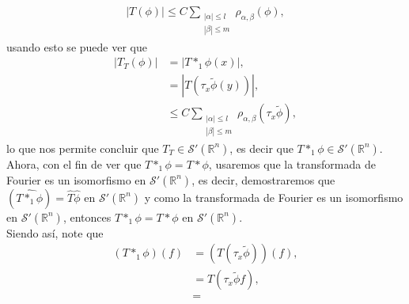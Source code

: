 \begin{homeworkProblem}
\begin{solution}
      \begin{align*}
        |T(\phi)|\leq C\sum_{\substack{|\alpha|\leq l\\ |\beta|\leq m}}\rho_{\alpha,\beta}(\phi),
      \end{align*}
      usando esto se puede ver que
      \begin{align*}
        |T_{T}(\phi)|&=\left| T*_{1}\phi(x) \right|,\\
        &=\left| T\left( \tau_{x}\tilde{\phi}(y) \right) \right|,\\
        &\leq C\sum_{\substack{|\alpha|\leq l\\|\beta|\leq m}}\rho_{\alpha,\beta}(\tau_{x}\tilde{\phi}),
      \end{align*}
      lo que nos permite concluir que $T_{T}\in\mathcal{S}'(\mathbb{R}^{n})$, es decir que $T*_{1}\phi\in\mathcal{S}'(\mathbb{R}^{n})$.\\
      Ahora, con el fin de ver que $T*_{1}\phi=T*\phi$, usaremos que la transformada de Fourier es un isomorfismo en $\mathcal{S}'(\mathbb{R}^{n})$, es decir, demostraremos que $\left(\hat{T*_{1}\phi}\right)=\hat{T}\hat{\phi}$ en $\mathcal{S}'(\mathbb{R}^{n})$ y como la transformada de Fourier es un isomorfismo en $\mathcal{S}'(\mathbb{R}^{n})$, entonces $T*_{1}\phi=T*\phi$ en $\mathcal{S}'(\mathbb{R}^{n})$.\\
      Siendo así, note que
      \begin{align*}
        \left( T*_{1}\phi \right)(f)&=\left( T(\tau_{x}\tilde{\phi}) \right)(f),\\
        &=T(\tau_{x}\tilde{\phi}f),\\
        &=
      \end{align*}
  \end{solution}
\end{homeworkProblem}
